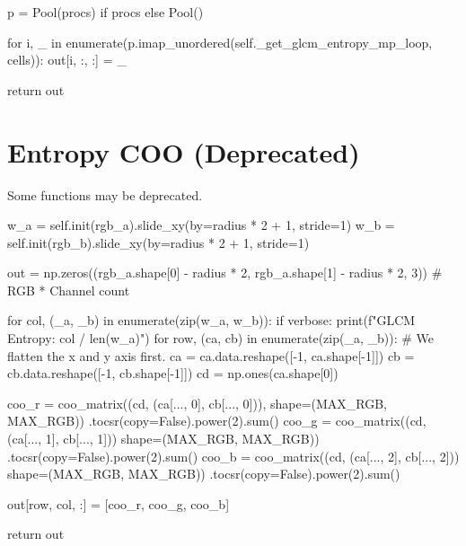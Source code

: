 \documentclass[article,oneside]{memoir}
\begin{document}
\begin{python}
p = Pool(procs) if procs else Pool()

for i, _ in enumerate(p.imap_unordered(self._get_glcm_entropy_mp_loop, cells)):
    out[i, :, :] = _

return out
\end{python}

\section{Entropy COO (Deprecated)}

Some functions may be deprecated.

\begin{python}
w_a = self.init(rgb_a).slide_xy(by=radius * 2 + 1, stride=1)
w_b = self.init(rgb_b).slide_xy(by=radius * 2 + 1, stride=1)

out = np.zeros((rgb_a.shape[0] - radius * 2,
                rgb_a.shape[1] - radius * 2,
                3))  # RGB * Channel count

for col, (_a, _b) in enumerate(zip(w_a, w_b)):
    if verbose: print(f"GLCM Entropy: {col} / {len(w_a)}")
    for row, (ca, cb) in enumerate(zip(_a, _b)):
        # We flatten the x and y axis first.
        ca = ca.data.reshape([-1, ca.shape[-1]])
        cb = cb.data.reshape([-1, cb.shape[-1]])
        cd = np.ones(ca.shape[0])

        coo_r = coo_matrix((cd, (ca[..., 0], cb[..., 0])),
                            shape=(MAX_RGB, MAX_RGB))
                            .tocsr(copy=False).power(2).sum()
        coo_g = coo_matrix((cd, (ca[..., 1], cb[..., 1]))
                            shape=(MAX_RGB, MAX_RGB))
                            .tocsr(copy=False).power(2).sum()
        coo_b = coo_matrix((cd, (ca[..., 2], cb[..., 2]))
                            shape=(MAX_RGB, MAX_RGB))
                            .tocsr(copy=False).power(2).sum()

        out[row, col, :] = [coo_r, coo_g, coo_b]

return out
\end{python}
\end{document}
